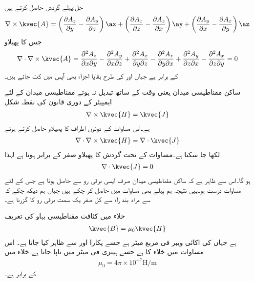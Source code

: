 حل:پہلے گردش حاصل کرتے ہیں
\begin{align*}
\nabla \times \kvec{A}=\left(\frac{\partial A_z}{\partial y}-\frac{\partial A_y}{\partial z} \right)\ax+\left(\frac{\partial A_x}{\partial z}-\frac{\partial A_z}{\partial x} \right)\ay+\left(\frac{\partial A_y}{\partial x}-\frac{\partial A_x}{\partial y} \right)\az
\end{align*}
جس کا پھیلاو
\begin{align*}
\nabla \cdot \nabla \times \kvec{A}=\frac{\partial^2 A_z}{\partial x \partial y}-\frac{\partial^2 A_y}{\partial x \partial z}+\frac{\partial^2 A_x}{\partial y \partial z}-\frac{\partial^2 A_z}{\partial y \partial x}+\frac{\partial^2 A_y}{\partial z \partial x}-\frac{\partial^2 A_x}{\partial z \partial y}=0
\end{align*}
کے برابر ہے جہاں  اور  کی طرح بقایا اجزاء بھی آپس میں کٹ جاتے ہیں۔

ساکن مقناطیسی میدان یعنی وقت کے ساتھ تبدیل نہ ہوتے مقناطیسی میدان کے لئے ایمپیئر کے دوری قانون کی نقطہ شکل
\begin{align*}
\nabla \times \kvec{H}=\kvec{J}
\end{align*}
ہے۔اس مساوات کے دونوں اطراف کا پھیلاو حاصل کرتے ہوئے
\begin{align*}
\nabla \cdot \nabla \times \kvec{H}=\nabla \cdot \kvec{J}
\end{align*}
لکھا جا سکتا ہے۔مساوات  کے تحت گردش کا پھیلاو صفر کے برابر ہوتا ہے لہٰذا
\begin{align}\label{مساوات_مقناطیسی_استمراری_مساوات}
\nabla \cdot \kvec{J}=0
\end{align}
ہو گا۔اس سے ظاہر ہے کہ ساکن مقناطیسی میدان صرف ایسی برقی رو سے حاصل ہوتا ہے  جس کے لئے مساوات  درست ہو۔یہی نتیجہ ہم پہلے بھی مساوات  میں حاصل کر چکے ہیں جہاں ہم دیکھ چکے کہ  سے مراد بند راہ سے کل صفر یک سمت برقی رو کا گزرنا ہے۔

خلاء میں کثافت مقناطیسی بہاو  کی تعریف
\begin{align}\label{مساوات_مقناطیسی_میدان_بالمقابل_شدت}
\kvec{B}=\mu_0 \kvec{H}
\end{align}
ہے جہاں  کی اکائی ویبر فی مربع میٹر  ہے جسے  پکارا اور  سے ظاہر کیا جاتا ہے۔ اس مساوات میں  خلاء کا  ہے جسے ہینری فی میٹر  میں ناپا جاتا ہے۔خلاء میں
\begin{align}
\mu_0=4\pi \times 10^{-7} \si{\henry \per \meter}
\end{align}
کے برابر ہے۔

